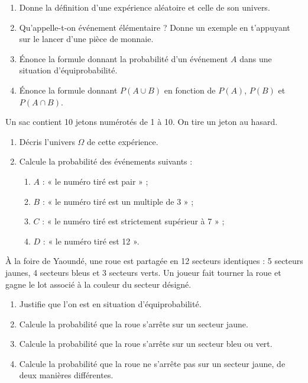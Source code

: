\documentclass[11pt]{article}
\newcommand{\cle}[1]{{\popxbold\color{popdark}#1}}
\newcounter{popsec}
\newcounter{popsub}
\newcommand{\courssub}[1]{%
  \stepcounter{popsub}%
  \par\vspace{9pt}\noindent{\popxbold\fontsize{11.5}{13}\selectfont\color{popink}{\color{poporange}\thepopsec.\thepopsub}\hspace{6pt}#1}\par\nopagebreak\vspace{4pt}
}
\begin{document}
\begin{exercice}
\begin{enumerate}
\item Donne la définition d'une \cle{expérience aléatoire} et celle de son \cle{univers}.
\item Qu'appelle-t-on \cle{événement élémentaire} ? Donne un exemple en t'appuyant sur le lancer d'une pièce de monnaie.
\item Énonce la formule donnant la probabilité d'un événement $A$ dans une situation d'\cle{équiprobabilité}.
\item Énonce la formule donnant $P(A \cup B)$ en fonction de $P(A)$, $P(B)$ et $P(A \cap B)$.
\end{enumerate}
\end{exercice}

\begin{exercice}
Un sac contient 10 jetons numérotés de 1 à 10. On tire un jeton au hasard.
\begin{enumerate}
\item Décris l'univers $\Omega$ de cette expérience.
\item Calcule la probabilité des événements suivants :
\begin{enumerate}
\item $A$ : « le numéro tiré est pair » ;
\item $B$ : « le numéro tiré est un multiple de 3 » ;
\item $C$ : « le numéro tiré est strictement supérieur à 7 » ;
\item $D$ : « le numéro tiré est 12 ».
\end{enumerate}
\end{enumerate}
\end{exercice}

\courssub{Je m'entraîne}

\begin{exercice}
À la foire de Yaoundé, une roue est partagée en 12 secteurs identiques : 5 secteurs jaunes, 4 secteurs bleus et 3 secteurs verts. Un joueur fait tourner la roue et gagne le lot associé à la couleur du secteur désigné.
\begin{enumerate}
\item Justifie que l'on est en situation d'équiprobabilité.
\item Calcule la probabilité que la roue s'arrête sur un secteur jaune.
\item Calcule la probabilité que la roue s'arrête sur un secteur bleu ou vert.
\item Calcule la probabilité que la roue ne s'arrête pas sur un secteur jaune, de deux manières différentes.
\end{enumerate}
\end{exercice}
\end{document}
